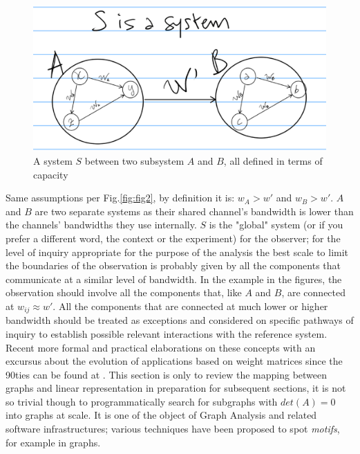 \documentclass[14pt]{extarticle}
\begin{document}
\begin{figure}[htbp]
\begin{minipage}[t]{0.90\linewidth}
    \includegraphics[width=\linewidth]{Fig__3_a_system-2.eps}
	\caption{A system \(S\) between two subsystem \(A\) and \(B\), all defined in terms of capacity}%
	\label{fig:fig3}
\end{minipage}%
\end{figure}

Same assumptions per Fig.\ref{fig:fig2}, by definition it is: \(w_A > w'\)  and  \(w_B > w'\). \(A\) and \(B\) are two separate systems as their shared channel's bandwidth is lower than the channels' bandwidths they use internally. \(S\) is the "global" system (or if you prefer a different word, the context or the experiment) for the observer; for the level of inquiry appropriate for the purpose of the analysis the best scale to limit the boundaries of the observation is probably given by all the components that communicate at a similar level of bandwidth. In the example in the figures, the observation should involve all the components that, like \(A\) and \(B\), are connected at \(w_{ij} \approx w'\). All the components that are connected at much lower or higher bandwidth should be treated as exceptions and considered on specific pathways of inquiry to establish possible relevant interactions with the reference system.
\newline
Recent more formal and practical elaborations on these concepts with an excursus about the evolution of applications based on weight matrices since the 90ties can be found at \cite{KAZUKIselfrefweights}.
\newline
This section is only to review the mapping between graphs and linear representation in preparation for subsequent sections, it is not so trivial though to programmatically search for subgraphs with \(det(A) = 0\) into graphs at scale. It is one of the object of Graph Analysis and related software infrastructures; various techniques have been proposed to spot \textit{motifs}, for example \cite{schreiber2004towards} in graphs.
\end{document}
